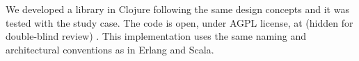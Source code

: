 
We developed a library in Clojure following the same design concepts and it was tested with the study case. The code is open, under AGPL license, at
(hidden for double-blind review)
. This implementation uses the same naming and architectural conventions as in Erlang and Scala.
